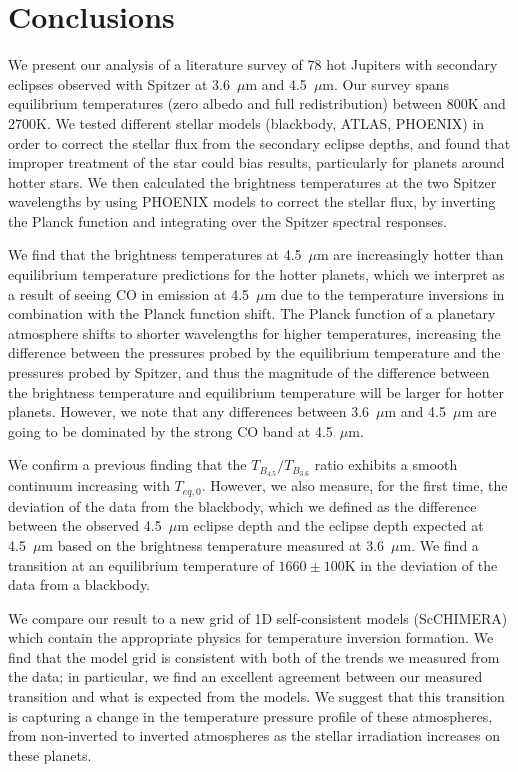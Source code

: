 
\section{Conclusions}

We present our analysis of a literature survey of 78 hot Jupiters with secondary eclipses observed with Spitzer at 3.6~$\mu$m and 4.5~$\mu$m. Our survey spans equilibrium temperatures (zero albedo and full redistribution) between 800K and 2700K. We tested different stellar models (blackbody, ATLAS, PHOENIX) in order to correct the stellar flux from the secondary eclipse depths, and found that improper treatment of the star could bias results, particularly for planets around hotter stars. We then calculated the brightness temperatures at the two Spitzer wavelengths by using PHOENIX models to correct the stellar flux, by inverting the Planck function and integrating over the Spitzer spectral responses.

We find that the brightness temperatures at 4.5~$\mu$m are increasingly hotter than equilibrium temperature predictions for the hotter planets, which we interpret as a result of seeing CO in emission at 4.5~$\mu$m due to the temperature inversions in combination with the Planck function shift. The Planck function of a planetary atmosphere shifts to shorter wavelengths for higher temperatures, increasing the difference between the pressures probed by the equilibrium temperature and the pressures probed by Spitzer, and thus the magnitude of the difference between the brightness temperature and equilibrium temperature will be larger for hotter planets. However, we note that any differences between 3.6~$\mu$m and 4.5~$\mu$m are going to be dominated by the strong CO band at 4.5~$\mu$m.

We confirm a previous finding that the $T_{B_{4.5}}/T_{B_{3.6}}$ ratio exhibits a smooth continuum increasing with $T_{eq,\textit{0}}$.
However, we also measure, for the first time, the deviation of the data from the blackbody, which we defined as the difference between the observed 4.5~$\mu$m eclipse depth and the eclipse depth expected at 4.5~$\mu$m based on the brightness temperature measured at 3.6~$\mu$m. We find a transition at an equilibrium temperature of $1660\pm100$K in the deviation of the data from a blackbody.

We compare our result to a new grid of 1D self-consistent models (ScCHIMERA) which contain the appropriate physics for temperature inversion formation. We find that the model grid is consistent with both of the trends we measured from the data; in particular, we find an excellent agreement between our measured transition and what is expected from the models. We suggest that this transition is capturing a change in the temperature pressure profile of these atmospheres, from non-inverted to inverted atmospheres as the stellar irradiation increases on these planets.

